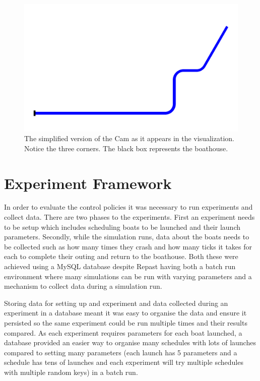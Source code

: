       \begin{figure}
      \begin{center}
        \includegraphics[scale=0.3]{images/SimplifiedCam.png}
        \caption{The simplified version of the Cam as it appears in the visualization. Notice the three corners. The black box represents the boathouse.}
        \label{techissues:fig:simplecam}
      \end{center}
      \end{figure}
      
  \section{Experiment Framework}
  In order to evaluate the control policies it was necessary to run
  experiments and collect data. There are two phases to the
  experiments. First an experiment needs to be setup which includes
  scheduling boats to be launched and their launch
  parameters. Secondly, while the simulation runs, data about the boats needs to be collected such as how many times they crash and how many ticks it takes for each to complete their outing and return to the boathouse. Both these were achieved using a MySQL database despite Repast having both a batch run environment where many simulations can be run with varying parameters and a mechanism to collect data during a simulation run. 
  
  Storing data for setting up and experiment and data collected during an experiment in a database meant it was easy to organise the data and ensure it persisted so the same experiment could be run multiple times and their results compared. As each experiment requires parameters for each boat launched, a database provided an easier way to organise many schedules with lots of launches compared to setting many parameters (each launch has 5 parameters and a schedule has tens of launches and each experiment will try multiple schedules with multiple random keys) in a batch run. 
  
